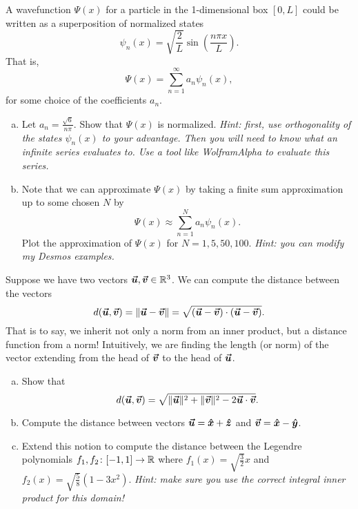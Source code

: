\documentclass[12pt]{article} %
\begin{document}
\begin{problem}
	A wavefunction $\Psi(x)$ for a particle in the 1-dimensional box $[0,L]$ could be written as a superposition of normalized states
	\[
	\psi_n(x) = \sqrt{\frac{2}{L}} \sin\left(\frac{n\pi x}{L}\right).
	\]
	That is,
	\[
	\Psi(x) = \sum_{n=1}^\infty a_n \psi_n(x),
	\]
	for some choice of the coefficients $a_n$.
	\begin{enumerate}[(a)]
		\item Let $a_n = \frac{\sqrt{6}}{n\pi}$. Show that $\Psi(x)$ is normalized. \emph{Hint: first, use orthogonality of the states $\psi_n(x)$ to your advantage. Then you will need to know what an infinite series evaluates to. Use a tool like WolframAlpha to evaluate this series.}
		\item Note that we can approximate $\Psi(x)$ by taking a finite sum approximation up to some chosen $N$ by
		\[
			\Psi(x) \approx \sum_{n=1}^N a_n \psi_n(x).
		\]
		Plot the approximation of $\Psi(x)$ for $N=1,5,50,100$.  \emph{Hint: you can modify my Desmos examples.}
		\end{enumerate}
\end{problem}

\begin{problem}
	Suppose we have two vectors $\boldsymbol{\vec{u}},\boldsymbol{\vec{v}} \in \mathbb{R}^3$.  We can compute the distance between the vectors
	\[
	d(\boldsymbol{\vec{u}},\boldsymbol{\vec{v}}) = \|\boldsymbol{\vec{u}}-\boldsymbol{\vec{v}}\| = \sqrt{(\boldsymbol{\vec{u}}-\boldsymbol{\vec{v}})\cdot(\boldsymbol{\vec{u}}-\boldsymbol{\vec{v}})}.
	\]
	That is to say, we inherit not only a norm from an inner product, but a distance function from a norm!  Intuitively, we are finding the length (or norm) of the vector extending from the head of $\boldsymbol{\vec{v}}$ to the head of $\boldsymbol{\vec{u}}$.
	\begin{enumerate}[(a)]
		\item Show that
		\[
		d(\boldsymbol{\vec{u}},\boldsymbol{\vec{v}}) = \sqrt{\|\boldsymbol{\vec{u}}\|^2+\|\boldsymbol{\vec{v}}\|^2-2\boldsymbol{\vec{u}}\cdot \boldsymbol{\vec{v}}}.
		\]
		\item Compute the distance between vectors $\boldsymbol{\vec{u}}=\boldsymbol{\hat{x}} + \boldsymbol{\hat{z}}$ and $\boldsymbol{\vec{v}} = \boldsymbol{\hat{x}} - \boldsymbol{\hat{y}}$.  
		\item Extend this notion to compute the distance between the Legendre polynomials $f_1,f_2\colon [-1,1] \to \mathbb{R}$ where $f_1(x)=\sqrt{\frac{3}{2}}x$ and $f_2(x)=\sqrt{\frac{5}{8}}\left(1-3x^2\right)$. \emph{Hint: make sure you use the correct integral inner product for this domain!}
	\end{enumerate}
\end{problem}
\end{document}

